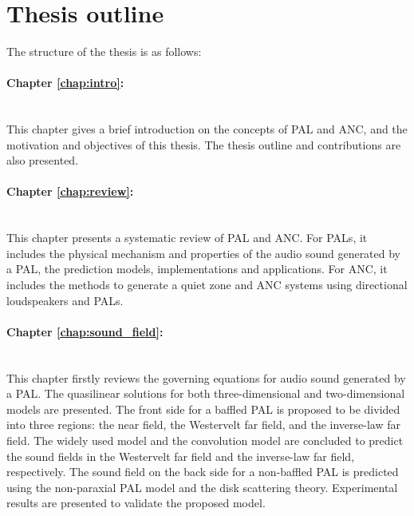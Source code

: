 \section{Thesis outline}
The structure of the thesis is as follows:

\noindent\paragraph{Chapter \ref{chap:intro}: }\mbox{}\\

This chapter gives a brief introduction on the concepts of PAL and ANC, and the motivation and objectives of this thesis.
The thesis outline and contributions are also presented.

\noindent\paragraph{Chapter \ref{chap:review}: }\mbox{}\\

This chapter presents a systematic review of PAL and ANC.
For PALs, it includes the physical mechanism and properties of the audio sound generated by a PAL, 
the prediction models, implementations and applications. 
For ANC, it includes the methods to generate a quiet zone and ANC systems using directional loudspeakers and PALs.

\noindent\paragraph{Chapter \ref{chap:sound_field}: }\mbox{}\\

This chapter firstly reviews the governing equations for audio sound generated by a PAL.
The quasilinear solutions for both three-dimensional and two-dimensional models are presented.
The front side for a baffled PAL is proposed to be divided into three regions: the near field, the Westervelt far field, and the inverse-law far field.
The widely used  model and the convolution model are concluded to predict the sound fields in the Westervelt far field and the inverse-law far field, respectively.
The sound field on the back side for a non-baffled PAL is predicted using the non-paraxial PAL model and the disk scattering theory.
Experimental results are presented to validate the proposed model.

